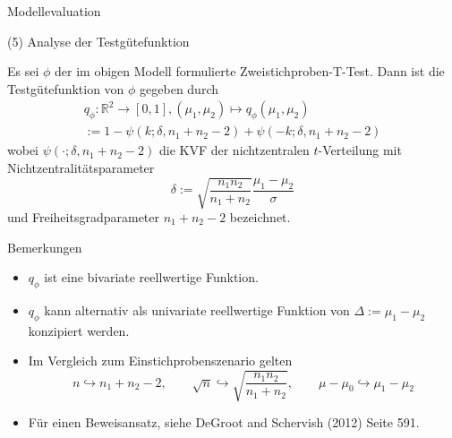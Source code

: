 \documentclass[
  8pt,
  ignorenonframetext,
]{beamer}
\providecommand{\tightlist}{%
  \setlength{\itemsep}{0pt}\setlength{\parskip}{0pt}}
\begin{document}
\begin{frame}{Modellevaluation}
\protect\hypertarget{modellevaluation-29}{}

\noindent (5) Analyse der Testgütefunktion

\footnotesize
\begin{theorem}[Testgütefunktion]
\justifying
\normalfont
Es sei $\phi$ der im obigen Modell formulierte Zweistichproben-T-Test. Dann ist
die Testgütefunktion von $\phi$ gegeben durch
\begin{multline}
q_{\phi} : \mathbb{R}^2 \to [0,1],
(\mu_1, \mu_2) \mapsto q_{\phi}(\mu_1, \mu_2)
\\ := 1 - \psi(k;\delta,n_1+n_2-2) + \psi(-k;\delta,n_1+n_2-2)
\end{multline}
wobei $\psi(\cdot; \delta, n_1+n_2-2)$  die KVF der nichtzentralen
$t$-Verteilung mit Nichtzentralitätsparameter
\begin{equation}
\delta := \sqrt{\frac{n_1n_2}{n_1+n_2}}\frac{\mu_1-\mu_2}{\sigma}
\end{equation}
und Freiheitsgradparameter $n_1+n_2-2$ bezeichnet.
\end{theorem}

Bemerkungen

\begin{itemize}
\tightlist
\item
  \(q_{\phi}\) ist eine bivariate reellwertige Funktion.
\item
  \(q_{\phi}\) kann alternativ als univariate reellwertige Funktion von
  \(\Delta := \mu_1 - \mu_2\) konzipiert werden.
\item
  Im Vergleich zum Einstichprobenszenario gelten \begin{equation}
  n \hookrightarrow n_1+n_2-2,\quad\quad
  \sqrt{n} \hookrightarrow \sqrt{\frac{n_1n_2}{n_1 + n_2}},\quad\quad
  \mu - \mu_0  \hookrightarrow \mu_1 - \mu_2
  \end{equation}
\item
  Für einen Beweisansatz, siehe DeGroot and Schervish (2012) Seite 591.
\end{itemize}
\end{frame}
\end{document}
